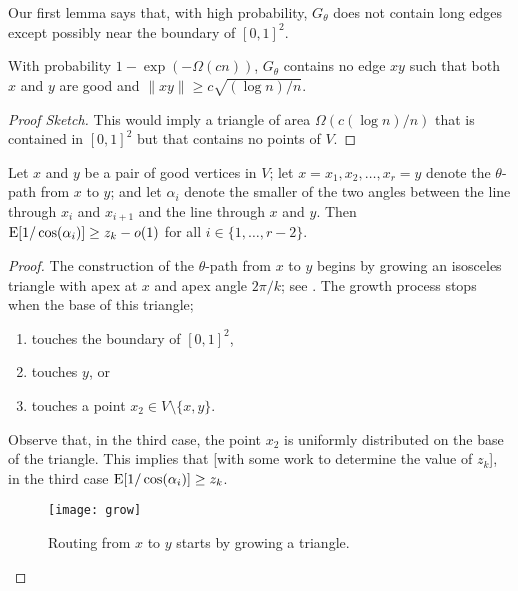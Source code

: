 \documentclass{patmorin}
\begin{document}
Our first lemma says that, with high probability, $G_\theta$ does not
contain long edges except possibly near the boundary of $[0,1]^2$.

\begin{lem}
  With probability $1-\exp(-\Omega(cn))$, $G_\theta$ contains no edge
  $xy$ such that both $x$ and $y$ are good and $\|xy\|\ge c\sqrt{(\log n)/n}$.
\end{lem}

\begin{proof}[Proof Sketch]
  This would imply a triangle of area $\Omega(c(\log n)/n)$ that is
  contained in $[0,1]^2$ but that contains no points of $V$.
\end{proof}


\begin{lem}
  Let $x$ and $y$ be a pair of good vertices in $V$;
  let $x=x_1,x_2,\ldots,x_r=y$ denote the $\theta$-path from $x$ to $y$; and 
  let $\alpha_i$ denote the smaller of the two angles between the line
  through $x_i$ and $x_{i+1}$ and the line through $x$ and $y$.  Then
  $\mathrm{E}[1/\cos(\alpha_i)] \ge z_k-o(1)$ for all $i\in\{1,\ldots,r-2\}$.
\end{lem}

\begin{proof}
  The construction of the $\theta$-path from $x$ to $y$ begins by growing
  an isosceles triangle with apex at $x$ and apex angle $2\pi/k$; see
  .  The growth process stops when the base of this triangle;
  \begin{enumerate}
    \item touches the boundary of $[0,1]^2$,
    \item touches $y$, or
    \item touches a point $x_2\in V\setminus\{x,y\}$.
  \end{enumerate}
  Observe that, in the third case, the point $x_2$ is uniformly
  distributed on the base of the triangle.  This implies that [with
  some work to determine the value of $z_k$], in the third case
  $\mathrm{E}[1/\cos(\alpha_i)] \ge z_k$.  

  \begin{figure}
    \begin{center}
      \texttt{[image: grow]}
    \end{center}
    \caption{Routing from $x$ to $y$ starts by growing a triangle.}   
  \end{figure}
\end{proof}   
\end{document}

